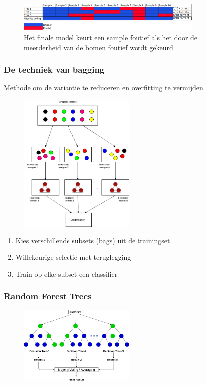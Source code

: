 \documentclass{article}
\begin{document}
\begin{figure}[H]
    \centering
    \includegraphics[width=0.8\textwidth]{bagging-majority-voting.png}
    \caption{Het finale model keurt een sample foutief als het door de meerderheid van de bomen foutief wordt gekeurd}
\end{figure}

\subsubsection{De techniek van bagging}

Methode om de variantie te reduceren en overfitting te vermijden

\begin{figure}[H]
    \centering
    \includegraphics[width=0.5\textwidth]{bagging-techniek.png}
\end{figure}

\begin{enumerate}
    \item Kies verschillende subsets (bags) uit de trainingset
    \item Willekeurige selectie met teruglegging
    \item Train op elke subset een classifier
\end{enumerate}

\subsubsection{Random Forest Trees}

\begin{figure}[H]
    \centering
    \includegraphics[width=0.5\textwidth]{bagging-random-forest-trees.png}
    \caption{}
\end{figure}
\end{document}
